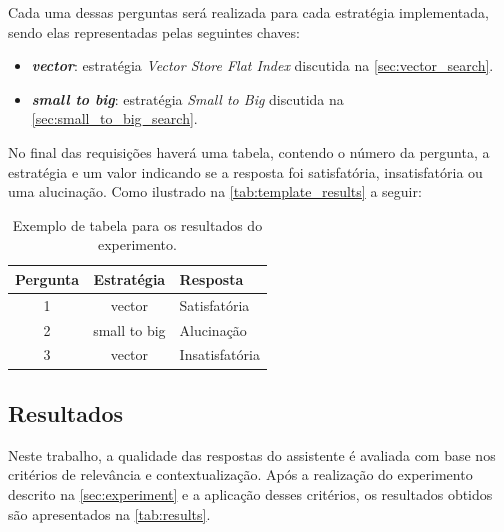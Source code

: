 \documentclass[a4paper, 12pt]{article}
\begin{document}
    Cada uma dessas perguntas será realizada para cada estratégia implementada, sendo elas representadas pelas seguintes chaves:
    
    \begin{itemize}
        \item \textbf{\textit{vector}}: estratégia \textit{Vector Store Flat Index} discutida na \autoref{sec:vector_search}.
        \item \textbf{\textit{small to big}}: estratégia \textit{Small to Big} discutida na \autoref{sec:small_to_big_search}.
    \end{itemize}
    
    No final das requisições haverá uma tabela, contendo o número da pergunta, a estratégia e um valor indicando se a resposta foi satisfatória, insatisfatória ou uma alucinação. Como ilustrado na \autoref{tab:template_results} a seguir:

    \begin{center}
        \begin{table}[h!]
        \centering
        \renewcommand{\arraystretch}{1.5} %
        \setlength{\tabcolsep}{8pt} %
        \begin{tabular}{|c|c|l|}
        \hline
        \textbf{Pergunta} & \textbf{Estratégia} & \textbf{Resposta} \\ \hline
         1                & vector              & Satisfatória      \\ \hline
         2                & small to big        & Alucinação        \\ \hline
         3                & vector              & Insatisfatória    \\ \hline
        \end{tabular}
        \caption{Exemplo de tabela para os resultados do experimento.}
        \label{tab:template_results}
        \end{table}
    \end{center}
    
    \subsection{Resultados} \label{sec:results}

    Neste trabalho, a qualidade das respostas do assistente é avaliada com base nos critérios de relevância e contextualização. Após a realização do experimento descrito na \autoref{sec:experiment} e a aplicação desses critérios, os resultados obtidos são apresentados na \autoref{tab:results}.
    
\end{document}
